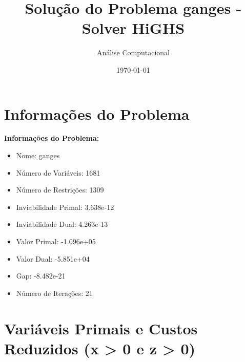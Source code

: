 \documentclass[12pt]{article}
\title{Solução do Problema ganges - Solver HiGHS}
\author{Análise Computacional}
\date{\today}
\begin{document}
\maketitle

\section{Informações do Problema}

\textbf{Informações do Problema:}
\begin{itemize}
\item Nome: ganges
\item Número de Variáveis: 1681
\item Número de Restrições: 1309
\item Inviabilidade Primal: 3.638e-12
\item Inviabilidade Dual: 4.263e-13
\item Valor Primal: -1.096e+05
\item Valor Dual: -5.851e+04
\item Gap: -8.482e-21
\item Número de Iterações: 21
\end{itemize}


\section{Variáveis Primais e Custos Reduzidos (x > 0 e z > 0)}
\end{document}
